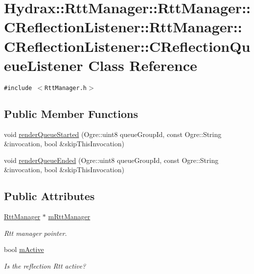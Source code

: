 \hypertarget{class_hydrax_1_1_rtt_manager_1_1_c_reflection_listener_1_1_c_reflection_queue_listener}{
\section{Hydrax::RttManager::RttManager::CReflectionListener::RttManager::CReflectionListener::CReflectionQueueListener Class Reference}
\label{class_hydrax_1_1_rtt_manager_1_1_c_reflection_listener_1_1_c_reflection_queue_listener}
}
{\tt \#include $<$RttManager.h$>$}

\subsection*{Public Member Functions}
\begin{CompactItemize}
\item 
void \hyperlink{class_hydrax_1_1_rtt_manager_1_1_c_reflection_listener_1_1_c_reflection_queue_listener_d1152ff369e7fa6a37bef7892611f0c0}{renderQueueStarted} (Ogre::uint8 queueGroupId, const Ogre::String \&invocation, bool \&skipThisInvocation)
\item 
void \hyperlink{class_hydrax_1_1_rtt_manager_1_1_c_reflection_listener_1_1_c_reflection_queue_listener_2f4b7681352adf5b6347beaf104f0896}{renderQueueEnded} (Ogre::uint8 queueGroupId, const Ogre::String \&invocation, bool \&skipThisInvocation)
\end{CompactItemize}
\subsection*{Public Attributes}
\begin{CompactItemize}
\item 
\hyperlink{class_hydrax_1_1_rtt_manager}{RttManager} $\ast$ \hyperlink{class_hydrax_1_1_rtt_manager_1_1_c_reflection_listener_1_1_c_reflection_queue_listener_1e870e5172aaf8ff82b598345f358830}{mRttManager}
\begin{CompactList}\small\item\em Rtt manager pointer. \item\end{CompactList}\item 
bool \hyperlink{class_hydrax_1_1_rtt_manager_1_1_c_reflection_listener_1_1_c_reflection_queue_listener_d2a1e19d54ceaf9d2c99cf613e4ba23a}{mActive}
\begin{CompactList}\small\item\em Is the reflection Rtt active? \item\end{CompactList}\end{CompactItemize}


